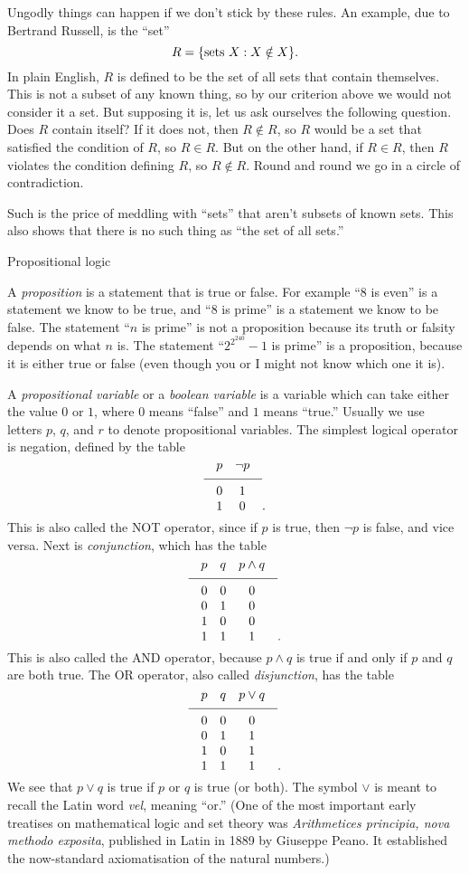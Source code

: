 Ungodly things can happen if we don't stick by these rules. An example, due to Bertrand Russell, is the ``set''
$$R = \{\hbox{sets}\ X : X \notin X \}.$$
In plain English, $R$ is defined to be the set of all sets that contain themselves.
This is not a subset of any known thing, so by our criterion above we would not consider it a set.
But supposing it is, let us ask ourselves the following question. Does $R$ contain itself?
If it does not, then $R\notin R$, so $R$ would be a set that satisfied the condition of $R$, so $R\in R$.
But on the other hand, if $R\in R$, then $R$ violates the condition defining $R$, so $R\notin R$.
Round and round we go in a circle of contradiction.

Such is the price of meddling with ``sets'' that aren't subsets of known sets. This also shows that there
is no such thing as ``the set of all sets.''

\advsect Propositional logic

A {\it proposition} is a statement that is true or false. For example ``$8$ is even'' is a statement
we know to be true, and ``$8$ is prime'' is a statement we know to be false. The statement
``$n$ is prime'' is not a proposition because its truth or falsity depends on what $n$ is.
The statement
``$2^{2^{240}} - 1$ is prime'' is a proposition, because it is either true or false (even though you or I
might not know which one it is).

A {\it propositional variable} or a {\it boolean variable} is a variable which can take either the
value $0$ or $1$, where $0$ means ``false'' and $1$ means ``true.'' Usually we use letters $p$, $q$,
and $r$ to denote propositional variables. The simplest logical operator is negation, defined
by the table
$$
\vbox{
\tabskip=1em plus.2em minus .2em
\halign{
\hfil$#$\hfil & \hfil$#$\hfil \cr
p & \neg p \cr
\noalign{\medskip}
\noalign{\hrule}
\noalign{\medskip}
0 & 1 \cr
1 & 0 \cr
}}.
$$
This is also called the {\mc NOT} operator, since if $p$ is true, then $\neg p$
is false, and vice versa.
Next is {\it conjunction}, which has the table
$$
\vbox{
\tabskip=1em plus.2em minus .2em
\halign{
\hfil$#$\hfil & \hfil$#$\hfil & \hfil$#$\hfil \cr
p & q & p\wedge q \cr
\noalign{\medskip}
\noalign{\hrule}
\noalign{\medskip}
0 & 0 & 0 \cr
0 & 1 & 0 \cr
1 & 0 & 0 \cr
1 & 1 & 1 \cr
}}.
$$
This is also called the {\mc AND} operator, because $p\wedge q$ is true if and only if $p$ and
$q$ are both true. The {\mc OR} operator, also called {\it disjunction}, has the table
$$
\vbox{
\tabskip=1em plus.2em minus .2em
\halign{
\hfil$#$\hfil & \hfil$#$\hfil & \hfil$#$\hfil \cr
p & q & p\vee q \cr
\noalign{\medskip}
\noalign{\hrule}
\noalign{\medskip}
0 & 0 & 0 \cr
0 & 1 & 1 \cr
1 & 0 & 1 \cr
1 & 1 & 1 \cr
}}.
$$
We see that $p\vee q$ is true if $p$ or $q$ is true (or both). The symbol $\vee$ is meant to recall
the Latin word {\it vel}, meaning ``or.'' (One of the most important early treatises on mathematical
logic and set theory was {\sl Arithmetices principia, nova methodo exposita}, published in Latin in 1889
by Giuseppe Peano. It established the now-standard axiomatisation of the natural numbers.)

